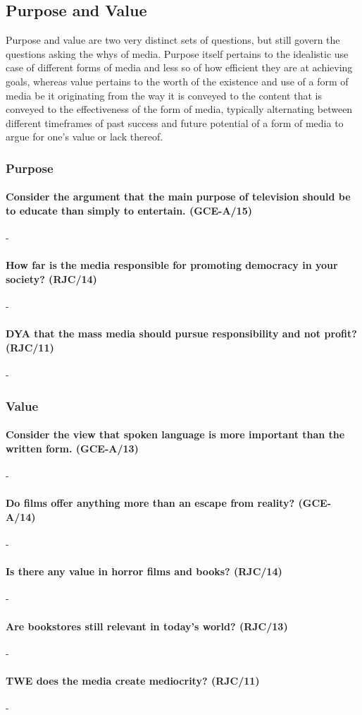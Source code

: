 \documentclass[../../main]{subfiles}
\begin{document}
\subsection{Purpose and Value}

Purpose and value are two very distinct sets of questions, but still govern the questions asking the whys of media. Purpose itself pertains to the idealistic use case of different forms of media and less so of how efficient they are at achieving goals, whereas value pertains to the worth of the existence and use of a form of media be it originating from the way it is conveyed to the content that is conveyed to the effectiveness of the form of media, typically alternating between different timeframes of past success and future potential of a form of media to argue for one's value or lack thereof. 

\subsubsection{Purpose}

\paragraph{Consider the argument that the main purpose of television should be to educate than simply to entertain. (GCE-A/15)}-

\paragraph{How far is the media responsible for promoting democracy in your society? (RJC/14)}-

\paragraph{DYA that the mass media should pursue responsibility and not profit? (RJC/11)}-

\subsubsection{Value}

\paragraph{Consider the view that spoken language is more important than the written form. (GCE-A/13)}-

\paragraph{Do films offer anything more than an escape from reality? (GCE-A/14)} -

\paragraph{Is there any value in horror films and books? (RJC/14)}-

\paragraph{Are bookstores still relevant in today's world? (RJC/13)}-

\paragraph{TWE does the media create mediocrity? (RJC/11)}-
\end{document}
